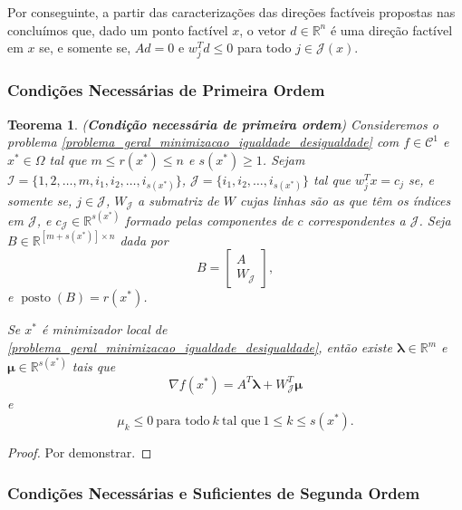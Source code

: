 \documentclass[12pt,a4paper]{scrartcl}
\DeclareMathOperator{\posto}{posto}
\def\RR{\mathds{R}}
\newtheorem{teo}{Teorema}
\theoremstyle{definition}%
\begin{document}
Por conseguinte, a partir das caracterizações das direções factíveis propostas nas  concluímos que, dado um ponto factível $x$, o vetor $d\in \RR^{n}$ é uma direção factível em $x$ se, e somente se, $Ad =0$ e $w_{j}^{T}d \leq 0$ para todo $j\in \mathcal{J}(x)$.


\subsubsection{Condições Necessárias de Primeira Ordem}

\begin{teo}(\textbf{Condição necessária de primeira ordem}) \label{teo:condicao_necessaria_1ordem_igualdade_desigualdade}
Consideremos o problema \eqref{problema_geral_minimizacao_igualdade_desigualdade} com $f\in \mathcal{C}^{1}$ e $x^{*} \in \Omega$ tal que $m\leq r(x^{*}) \leq n$ e $s(x^{*}) \geq 1$. Sejam $\mathcal{I} = \{ 1,2, \ldots ,m, i_{1} , i_{2} , \ldots , i_{s(x^{*})} \}$, $\mathcal{J} = \{ i_{1} , i_{2} , \ldots , i_{s(x^{*})} \}$ tal que $w_{j}^{T}x = c_{j}$ se, e somente se, $j\in \mathcal{J}$, $W_{\mathcal{J}}$ a submatriz de $W$ cujas linhas são as que têm os índices em $\mathcal{J}$, e $c_{\mathcal{J}} \in \RR^{s(x^{*})}$ formado pelas componentes de $c$ correspondentes a $\mathcal{J}$. Seja $B \in \RR^{[m+s(x^{*})]\times n}$ dada por
\[
B = \begin{bmatrix*} A \\ W_{\mathcal{J}} \end{bmatrix*} ,
\]
e $\posto (B)= r(x^{*})$.

Se $x^{*}$ é minimizador local de \eqref{problema_geral_minimizacao_igualdade_desigualdade}, então existe $\boldsymbol{\lambda} \in \RR^{m}$ e $\boldsymbol{\mu} \in \RR^{s(x^{*})}$ tais que
\[
\nabla f(x^{*}) = A^{T}\boldsymbol{\lambda} + W^{T}_{\mathcal{J}} \boldsymbol{\mu}
\]
e
\[
\mu_{k} \leq 0 \ \text{para todo} \ k \ \text{tal que} \ 1 \leq k \leq s(x^{*}).
\]
\end{teo}
\begin{proof}
Por demonstrar.
\end{proof}


\subsubsection{Condições Necessárias e Suficientes de Segunda Ordem}
\end{document}

